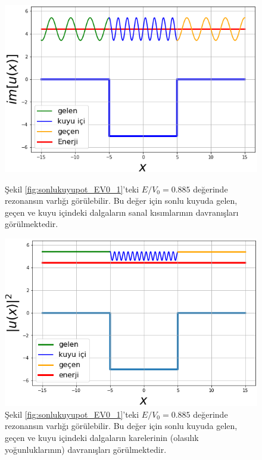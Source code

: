 \documentclass[a4paper,12pt, twoside]{article}
\begin{document}
\begin{figure}[hbtp]
	\begin{minipage}{.48\textwidth}
		\centering
		\includegraphics[width=\linewidth]{figurler/SonluKuyu_Potansiyeli_TR_imU.png}
		\caption{Şekil \ref{fig:sonlukuyupot_EV0_1}'teki $E/V_0 = 0.885$ değerinde rezonansın varlığı görülebilir. Bu değer için sonlu kuyuda gelen, geçen ve kuyu içindeki dalgaların sanal kısımlarının davranışları görülmektedir.}
		\label{fig:sonlukuyupot_imU}
	\end{minipage}
	\hspace{24pt}
	\begin{minipage}{.48\textwidth}
		\centering
\includegraphics[width=\linewidth]{figurler/SonluKuyu_Potansiyeli_TR_u2.png}
\caption{Şekil \ref{fig:sonlukuyupot_EV0_1}'teki $E/V_0 = 0.885$ değerinde rezonansın varlığı görülebilir. Bu değer için sonlu kuyuda gelen, geçen ve kuyu içindeki dalgaların karelerinin (olasılık yoğunluklarının) davranışları görülmektedir.}
\label{fig:sonlukuyupot_u2}
	\end{minipage}
\end{figure}
\end{document}
